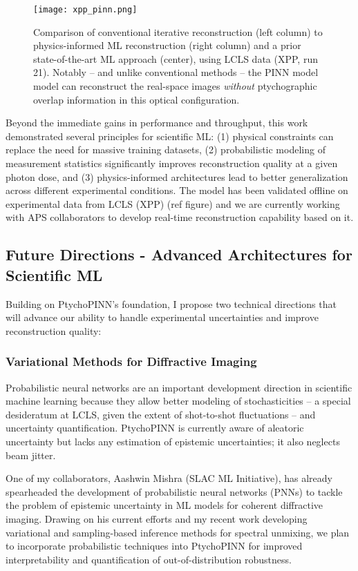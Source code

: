 \documentclass{article}
\begin{document}
\begin{figure}[htbp]
    \centering
    \texttt{[image: xpp\_pinn.png]}
    \caption{Comparison of conventional iterative reconstruction (left column) to physics-informed ML reconstruction (right column) and a prior state-of-the-art ML approach (center), using LCLS data (XPP, run 21). Notably -- and unlike conventional methods -- the PINN model model can reconstruct the real-space images \emph{without} ptychographic overlap information in this optical configuration.}
    \label{fig:comparison}
\end{figure}
Beyond the immediate gains in performance and throughput, this work demonstrated several principles for scientific ML: (1) physical constraints can replace the need for massive training datasets, (2) probabilistic modeling of measurement statistics significantly improves reconstruction quality at a given photon dose, and (3) physics-informed architectures lead to better generalization across different experimental conditions. The model has been validated offline on experimental data from LCLS (XPP) (ref figure) and we are currently working with APS collaborators to develop real-time reconstruction capability based on it. 

\subsection{Future Directions - Advanced Architectures for Scientific ML}
Building on PtychoPINN's foundation, I propose two technical directions that will advance our ability to handle experimental uncertainties and improve reconstruction quality:

\subsubsection{Variational Methods for Diffractive Imaging}
Probabilistic neural networks are an important development direction in scientific machine learning because they allow better modeling of stochasticities -- a special desideratum at LCLS, given the extent of shot-to-shot fluctuations -- and uncertainty quantification. PtychoPINN is currently aware of aleatoric uncertainty but lacks any estimation of epistemic uncertainties; it also neglects beam jitter. 

One of my collaborators, Aashwin Mishra (SLAC ML Initiative), has already spearheaded the development of probabilistic neural networks (PNNs) to tackle the problem of epistemic uncertainty in ML models for coherent diffractive imaging. Drawing on his current efforts and my recent work developing variational and sampling-based inference methods for spectral unmixing, we plan to incorporate probabilistic techniques into PtychoPINN for improved interpretability and quantification of out-of-distribution robustness. \cite{hoidn2024probabilistic}
\end{document}
